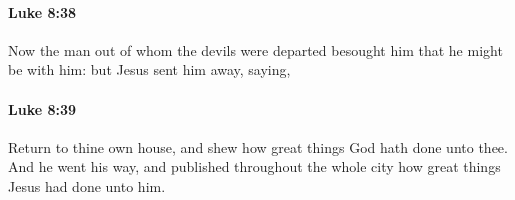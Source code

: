 		\paragraph{Luke 8:38} %
			\label{LUKE-8-38}

			Now the man out of whom the devils were departed besought him that he might be with him: but Jesus sent him away, saying,

			\begin{framed}
			\scriptsize
				\begin{compactdesc}
					\item[SBLG] 
				\end{compactdesc}
			\end{framed}

		\paragraph{Luke 8:39} %
			\label{LUKE-8-39}

			Return to thine own house, and shew how great things God hath done unto thee. And he went his way, and published throughout the whole city how great things Jesus had done unto him.

